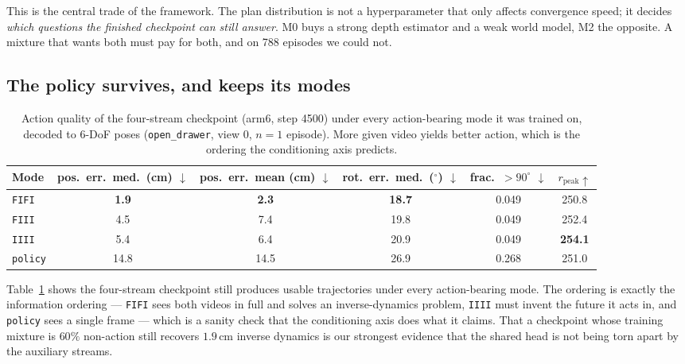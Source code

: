 \documentclass{article} %
\newcommand{\best}[1]{\textbf{#1}}
\newcommand{\tabref}[1]{Table~\ref{#1}}
\begin{document}
This is the central trade of the framework. The plan distribution is not a hyperparameter that
only affects convergence speed; it decides \emph{which questions the finished checkpoint can still
answer}. M0 buys a strong depth estimator and a weak world model, M2 the opposite. A mixture that
wants both must pay for both, and on 788 episodes we could not.

\subsection{The policy survives, and keeps its modes}

\begin{table}[t]
\caption{Action quality of the four-stream checkpoint (arm6, step 4500) under every action-bearing
mode it was trained on, decoded to 6-DoF poses (\texttt{open\_drawer}, view 0, $n{=}1$ episode).
More given video yields better action, which is the ordering the conditioning axis predicts.}
\label{tab:action}
\begin{center}\small
\begin{tabular}{lccccc}
\toprule
\textbf{Mode} & pos.\ err.\ med.\ (cm) $\downarrow$ & pos.\ err.\ mean (cm) $\downarrow$ & rot.\ err.\ med.\ ($^\circ$) $\downarrow$ & frac.\ ${>}90^\circ$ $\downarrow$ & $r_{\text{peak}}\uparrow$ \\
\midrule
\texttt{FIFI}   & \best{1.9} & \best{2.3} & \best{18.7} & 0.049 & 250.8 \\
\texttt{FIII}   & 4.5 & 7.4 & 19.8 & 0.049 & 252.4 \\
\texttt{IIII}   & 5.4 & 6.4 & 20.9 & 0.049 & \best{254.1} \\
\texttt{policy} & 14.8 & 14.5 & 26.9 & 0.268 & 251.0 \\
\bottomrule
\end{tabular}
\end{center}
\end{table}

\tabref{tab:action} shows the four-stream checkpoint still produces usable trajectories under every
action-bearing mode. The ordering is exactly the information ordering --- \texttt{FIFI} sees both
videos in full and solves an inverse-dynamics problem, \texttt{IIII} must invent the future it acts
in, and \texttt{policy} sees a single frame --- which is a sanity check that the conditioning axis
does what it claims. That a checkpoint whose training mixture is $60\%$ non-action still recovers
$1.9$\,cm inverse dynamics is our strongest evidence that the shared head is not being torn apart
by the auxiliary streams.
\end{document}
